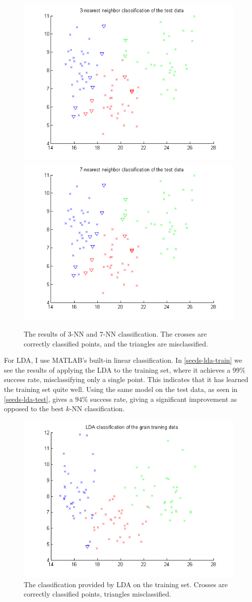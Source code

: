 \documentclass[11pt,a4paper]{article}
\begin{document}
\begin{figure}[h!]
    \centering
    \includegraphics[width=.45\textwidth]{images/seeds-3nn-success}
    \includegraphics[width=.45\textwidth]{images/seeds-7nn-success}
    \caption{The results of $3$-NN and $7$-NN classification. The crosses are
             correctly classified points, and the triangles are misclassified.}
    \label{seeds-knn-plot}
\end{figure}

For LDA, I use MATLAB's built-in linear classification. In
\autoref{seeds-lda-train} we see the results of applying the LDA to the
training set, where it achieves a $99\%$ success rate, misclassifying only a
single point. This indicates that it has learned the training set quite well.
Using the same model on the test data, as seen in \autoref{seeds-lda-test},
gives a $94\%$ success rate, giving a significant improvement as opposed to
the best $k$-NN classification.

\begin{figure}[h!]
    \centering
    \includegraphics[width=.75\textwidth]{images/seeds-lda-train}
    \caption{The classification provided by LDA on the training set. Crosses are correctly classified points, triangles misclassified.}
    \label{seeds-lda-train}
\end{figure}
\end{document}
